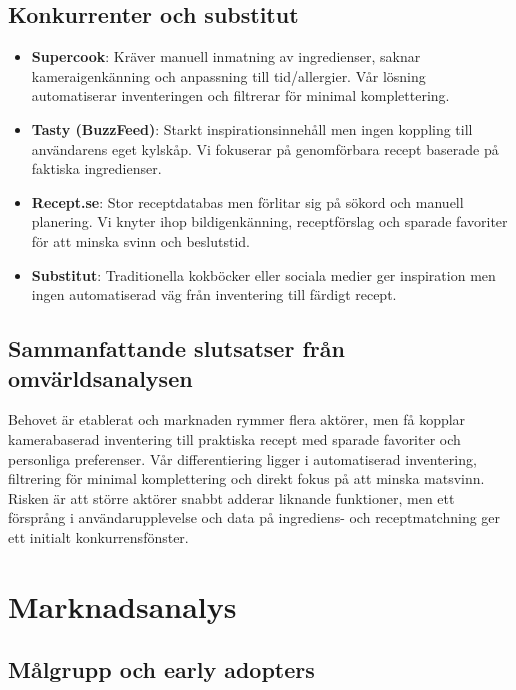 \documentclass[a4paper,12pt]{article}
\begin{document}
\subsection{Konkurrenter och substitut}
\begin{itemize}
    \item \textbf{Supercook}: Kräver manuell inmatning av ingredienser, saknar kameraigenkänning och anpassning till tid/allergier. Vår lösning automatiserar inventeringen och filtrerar för minimal komplettering.
    \item \textbf{Tasty (BuzzFeed)}: Starkt inspirationsinnehåll men ingen koppling till användarens eget kylskåp. Vi fokuserar på genomförbara recept baserade på faktiska ingredienser.
    \item \textbf{Recept.se}: Stor receptdatabas men förlitar sig på sökord och manuell planering. Vi knyter ihop bildigenkänning, receptförslag och sparade favoriter för att minska svinn och beslutstid.
    \item \textbf{Substitut}: Traditionella kokböcker eller sociala medier ger inspiration men ingen automatiserad väg från inventering till färdigt recept.
\end{itemize}

\subsection{Sammanfattande slutsatser från omvärldsanalysen}
Behovet är etablerat och marknaden rymmer flera aktörer, men få kopplar kamerabaserad inventering till praktiska recept med sparade favoriter och personliga preferenser. Vår differentiering ligger i automatiserad inventering, filtrering för minimal komplettering och direkt fokus på att minska matsvinn. Risken är att större aktörer snabbt adderar liknande funktioner, men ett försprång i användarupplevelse och data på ingrediens- och receptmatchning ger ett initialt konkurrensfönster.


\section{Marknadsanalys}

\subsection{Målgrupp och early adopters}
\end{document}
